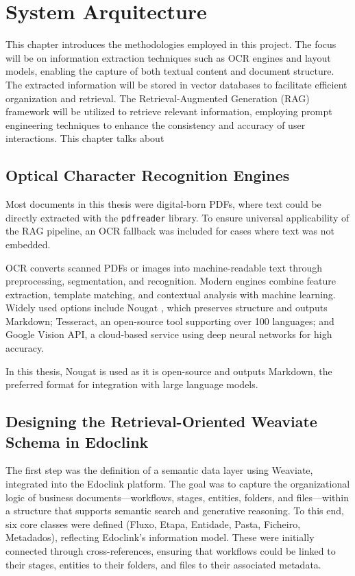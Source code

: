 \chapter{System Arquitecture}
\label{chapter:Methodologies}
This chapter introduces the methodologies employed in this project. The focus will be on information extraction techniques such as OCR engines and layout models, enabling the capture of both textual content and document structure. The extracted information will be stored in vector databases to facilitate efficient organization and retrieval. The Retrieval-Augmented Generation (RAG) framework will be utilized to retrieve relevant information, employing prompt engineering techniques to enhance the consistency and accuracy of user interactions. 
This chapter talks about

\section{Optical Character Recognition Engines}
\label{sec:ocr}
Most documents in this thesis were digital-born PDFs, where text could be directly extracted with the \texttt{pdfreader} library. To ensure universal applicability of the RAG pipeline, an OCR fallback was included for cases where text was not embedded. 

OCR converts scanned PDFs or images into machine-readable text through preprocessing, segmentation, and recognition. Modern engines combine feature extraction, template matching, and contextual analysis with machine learning. Widely used options include Nougat \cite{blecher2023nougatneuralopticalunderstanding}, which preserves structure and outputs Markdown; Tesseract, an open-source tool supporting over 100 languages; and Google Vision API, a cloud-based service using deep neural networks for high accuracy.

In this thesis, Nougat is used as it is open-source and outputs Markdown, the preferred format for integration with large language models.



\section{Designing the Retrieval-Oriented Weaviate Schema in Edoclink}
\label{sec:schema}

The first step was the definition of a semantic data layer using Weaviate, integrated into the Edoclink platform. The goal was to capture the organizational logic of business documents—workflows, stages, entities, folders, and files—within a structure that supports semantic search and generative reasoning. To this end, six core classes were defined (Fluxo, Etapa, Entidade, Pasta, Ficheiro, Metadados), reflecting Edoclink’s information model. These were initially connected through cross-references, ensuring that workflows could be linked to their stages, entities to their folders, and files to their associated metadata.

